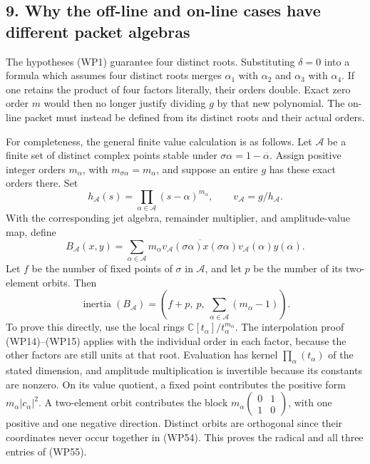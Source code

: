 \documentclass[
  10pt,
  a4paper,
]{article}
\begin{document}
\subsection{9. Why the off-line and on-line cases have different packet
algebras}\label{why-the-off-line-and-on-line-cases-have-different-packet-algebras}

The hypotheses (WP1) guarantee four distinct roots. Substituting
\(\delta=0\) into a formula which assumes four distinct roots merges
\(\alpha_1\) with \(\alpha_2\) and \(\alpha_3\) with \(\alpha_4\). If
one retains the product of four factors literally, their orders double.
Exact zero order \(m\) would then no longer justify dividing \(g\) by
that new polynomial. The on-line packet must instead be defined from its
distinct roots and their actual orders.

For completeness, the general finite value calculation is as follows.
Let \(\mathcal A\) be a finite set of distinct complex points stable
under \(\sigma\alpha=1-\overline\alpha\). Assign positive integer orders
\(m_\alpha\), with \(m_{\sigma\alpha}=m_\alpha\), and suppose an entire
\(g\) has these exact orders there. Set \[
h_{\mathcal A}(s)=\prod_{\alpha\in\mathcal A}(s-\alpha)^{m_\alpha},
\qquad v_{\mathcal A}=g/h_{\mathcal A}.
\tag{WP53}
\] With the corresponding jet algebra, remainder multiplier, and
amplitude-value map, define \[
B_{\mathcal A}(x,y)=
\sum_{\alpha\in\mathcal A}m_\alpha
\overline{v_{\mathcal A}(\sigma\alpha)x(\sigma\alpha)}
v_{\mathcal A}(\alpha)y(\alpha).
\tag{WP54}
\] Let \(f\) be the number of fixed points of \(\sigma\) in
\(\mathcal A\), and let \(p\) be the number of its two-element orbits.
Then \[
\operatorname{inertia}(B_{\mathcal A})
=\left(f+p,\ p,\ \sum_{\alpha\in\mathcal A}(m_\alpha-1)\right).
\tag{WP55}
\] To prove this directly, use the local rings
\(\mathbb C[t_\alpha]/t_\alpha^{m_\alpha}\). The interpolation proof
(WP14)--(WP15) applies with the individual order in each factor, because
the other factors are still units at that root. Evaluation has kernel
\(\prod_\alpha(t_\alpha)\) of the stated dimension, and amplitude
multiplication is invertible because its constants are nonzero. On its
value quotient, a fixed point contributes the positive form
\(m_\alpha|c_\alpha|^2\). A two-element orbit contributes the block
\(m_\alpha\begin{pmatrix}0&1\\1&0\end{pmatrix}\), with one positive and
one negative direction. Distinct orbits are orthogonal since their
coordinates never occur together in (WP54). This proves the radical and
all three entries of (WP55).
\end{document}
